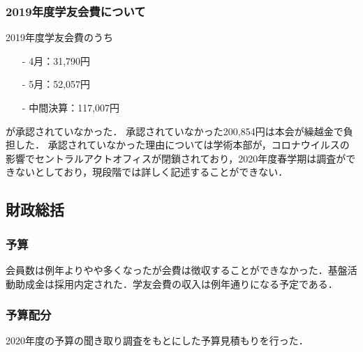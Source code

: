 \subsubsection*{2019年度学友会費について}
2019年度学友会費のうち
\begin{itemize}
	\item[-]4月：31,790円
	\item[-]5月：52,057円
	\item[-]中間決算：117,007円
\end{itemize}
が承認されていなかった．
承認されていなかった200,854円は本会が繰越金で負担した．
承認されていなかった理由については学術本部が，コロナウイルスの影響でセントラルアクトオフィスが閉鎖されており，2020年度春学期は調査ができないとしており，現段階では詳しく記述することができない．


\subsection*{財政総括}


\subsubsection*{予算}
会員数は例年よりやや多くなったが会費は徴収することができなかった．基盤活動助成金は採用内定された．学友会費の収入は例年通りになる予定である．

\subsubsection*{予算配分}
2020年度の予算の聞き取り調査をもとにした予算見積もりを行った．
